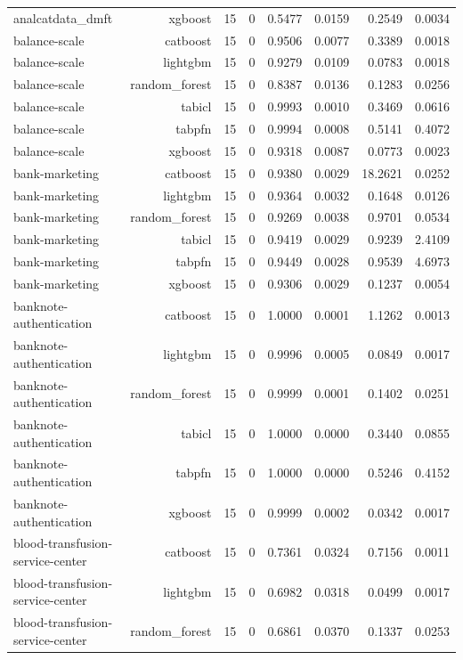 \begin{table}[htbp]
\begin{tabular}{lrrrrrrr}
analcatdata\_dmft & xgboost & 15 & 0 & 0.5477 & 0.0159 & 0.2549 & 0.0034 \\
balance-scale & catboost & 15 & 0 & 0.9506 & 0.0077 & 0.3389 & 0.0018 \\
balance-scale & lightgbm & 15 & 0 & 0.9279 & 0.0109 & 0.0783 & 0.0018 \\
balance-scale & random\_forest & 15 & 0 & 0.8387 & 0.0136 & 0.1283 & 0.0256 \\
balance-scale & tabicl & 15 & 0 & 0.9993 & 0.0010 & 0.3469 & 0.0616 \\
balance-scale & tabpfn & 15 & 0 & 0.9994 & 0.0008 & 0.5141 & 0.4072 \\
balance-scale & xgboost & 15 & 0 & 0.9318 & 0.0087 & 0.0773 & 0.0023 \\
bank-marketing & catboost & 15 & 0 & 0.9380 & 0.0029 & 18.2621 & 0.0252 \\
bank-marketing & lightgbm & 15 & 0 & 0.9364 & 0.0032 & 0.1648 & 0.0126 \\
bank-marketing & random\_forest & 15 & 0 & 0.9269 & 0.0038 & 0.9701 & 0.0534 \\
bank-marketing & tabicl & 15 & 0 & 0.9419 & 0.0029 & 0.9239 & 2.4109 \\
bank-marketing & tabpfn & 15 & 0 & 0.9449 & 0.0028 & 0.9539 & 4.6973 \\
bank-marketing & xgboost & 15 & 0 & 0.9306 & 0.0029 & 0.1237 & 0.0054 \\
banknote-authentication & catboost & 15 & 0 & 1.0000 & 0.0001 & 1.1262 & 0.0013 \\
banknote-authentication & lightgbm & 15 & 0 & 0.9996 & 0.0005 & 0.0849 & 0.0017 \\
banknote-authentication & random\_forest & 15 & 0 & 0.9999 & 0.0001 & 0.1402 & 0.0251 \\
banknote-authentication & tabicl & 15 & 0 & 1.0000 & 0.0000 & 0.3440 & 0.0855 \\
banknote-authentication & tabpfn & 15 & 0 & 1.0000 & 0.0000 & 0.5246 & 0.4152 \\
banknote-authentication & xgboost & 15 & 0 & 0.9999 & 0.0002 & 0.0342 & 0.0017 \\
blood-transfusion-service-center & catboost & 15 & 0 & 0.7361 & 0.0324 & 0.7156 & 0.0011 \\
blood-transfusion-service-center & lightgbm & 15 & 0 & 0.6982 & 0.0318 & 0.0499 & 0.0017 \\
blood-transfusion-service-center & random\_forest & 15 & 0 & 0.6861 & 0.0370 & 0.1337 & 0.0253 \\

\end{tabular}
\end{table}
